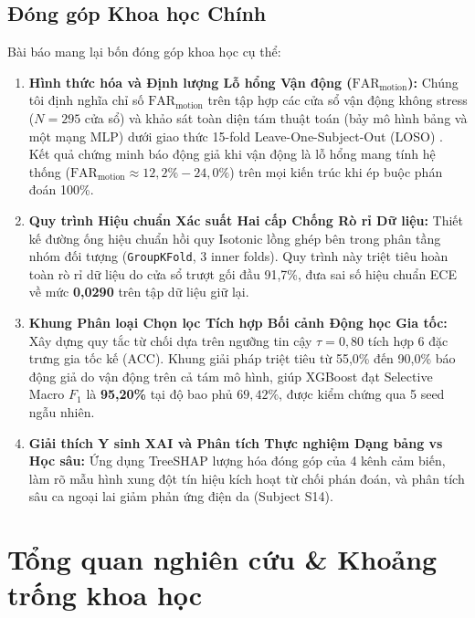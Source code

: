 \documentclass[conference]{IEEEtran}
\begin{document}
\subsection{Đóng góp Khoa học Chính}
Bài báo mang lại bốn đóng góp khoa học cụ thể:
\begin{enumerate}
    \item \textbf{Hình thức hóa và Định lượng Lỗ hổng Vận động ($\text{FAR}_{\text{motion}}$):} Chúng tôi định nghĩa chỉ số $\text{FAR}_{\text{motion}}$ trên tập hợp các cửa sổ vận động không stress ($N=295$ cửa sổ) và khảo sát toàn diện tám thuật toán (bảy mô hình bảng và một mạng MLP) dưới giao thức 15-fold Leave-One-Subject-Out (LOSO) \cite{saeb2017need, little2017using}. Kết quả chứng minh báo động giả khi vận động là lỗ hổng mang tính hệ thống ($\text{FAR}_{\text{motion}} \approx 12,2\% - 24,0\%$) trên mọi kiến trúc khi ép buộc phán đoán 100\%.
    \item \textbf{Quy trình Hiệu chuẩn Xác suất Hai cấp Chống Rò rỉ Dữ liệu:} Thiết kế đường ống hiệu chuẩn hồi quy Isotonic lồng ghép bên trong phân tầng nhóm đối tượng (\texttt{GroupKFold}, 3 inner folds). Quy trình này triệt tiêu hoàn toàn rò rỉ dữ liệu do cửa sổ trượt gối đầu 91,7\%, đưa sai số hiệu chuẩn ECE về mức \textbf{0,0290} trên tập dữ liệu giữ lại.
    \item \textbf{Khung Phân loại Chọn lọc Tích hợp Bối cảnh Động học Gia tốc:} Xây dựng quy tắc từ chối dựa trên ngưỡng tin cậy $\tau = 0,80$ tích hợp 6 đặc trưng gia tốc kế (ACC). Khung giải pháp triệt tiêu từ 55,0\% đến 90,0\% báo động giả do vận động trên cả tám mô hình, giúp XGBoost đạt Selective Macro $F_1$ là \textbf{95,20\%} tại độ bao phủ $69,42\%$, được kiểm chứng qua 5 seed ngẫu nhiên.
    \item \textbf{Giải thích Y sinh XAI và Phân tích Thực nghiệm Dạng bảng vs Học sâu:} Ứng dụng TreeSHAP \cite{lundberg2020local} lượng hóa đóng góp của 4 kênh cảm biến, làm rõ mẫu hình xung đột tín hiệu kích hoạt từ chối phán đoán, và phân tích sâu ca ngoại lai giảm phản ứng điện da (Subject S14).
\end{enumerate}

\section{Tổng quan nghiên cứu \& Khoảng trống khoa học}
\end{document}
